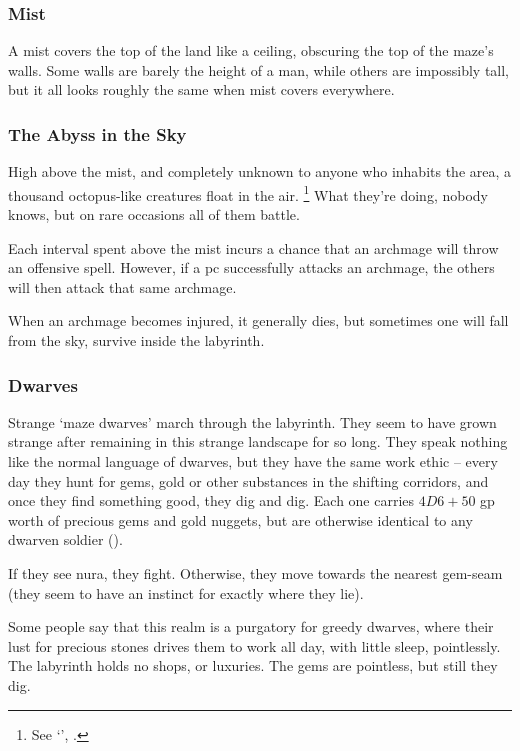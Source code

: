 \begin{multicols}{2}
\subsubsection{Mist}

A mist covers the top of the land like a ceiling, obscuring the top of the maze's walls.
Some walls are barely the height of a man, while others are impossibly tall, but it all looks roughly the same when mist covers everywhere.

\subsubsection{The Abyss in the Sky}

High above the mist, and completely unknown to anyone who inhabits the area, a thousand octopus-like creatures float in the air.
\footnote{See `', .}
What they're doing, nobody knows, but on rare occasions all of them battle.

Each \gls{interval} spent above the mist incurs a chance that an archmage will throw an offensive spell.
However, if a \gls{pc} successfully attacks an archmage, the others will then attack that same archmage.

When an archmage becomes injured, it generally dies, but sometimes one will fall from the sky, survive inside the labyrinth.

\subsubsection{Dwarves}

Strange `maze dwarves' march through the labyrinth.
They seem to have grown strange after remaining in this strange landscape for so long.
They speak nothing like the normal language of dwarves, but they have the same work ethic -- every day they hunt for gems, gold or other substances in the shifting corridors, and once they find something good, they dig and dig.
Each one carries $4D6 + 50$ gp worth of precious gems and gold nuggets, but are otherwise identical to any dwarven soldier ().

If they see nura, they fight.
Otherwise, they move towards the nearest gem-seam (they seem to have an instinct for exactly where they lie).

Some people say that this realm is a purgatory for greedy dwarves, where their lust for precious stones drives them to work all day, with little sleep, pointlessly.
The labyrinth holds no shops, or luxuries.
The gems are pointless, but still they dig.


\end{multicols}
